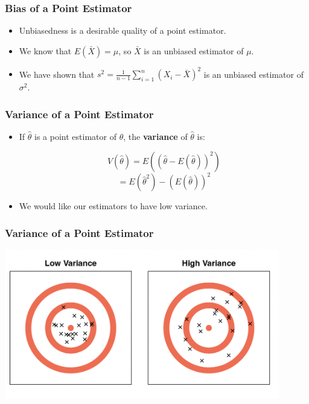 \documentclass[12pt]{beamer}
\begin{document}
\begin{frame}
	\frametitle{Bias of a Point Estimator}
	
	\begin{itemize}[label={\color{blue}$\blacktriangleright$}]
		\item Unbiasedness is a desirable quality of a point estimator.
		
		\item We know that $E(\bar{X}) = \mu$, so $\bar{X}$ is an unbiased estimator of $\mu$.
		
		\item We have shown that $s^2= \frac{1}{n-1} \sum_{i=1}^n (X_i - \bar{X})^2$ is an unbiased estimator of $\sigma^2$.
	\end{itemize}
	
\end{frame}

\begin{frame}
	\frametitle{Variance of a Point Estimator}
	
	\begin{itemize}[label={\color{blue}$\blacktriangleright$}]
		\item If $\hat{\theta}$ is a point estimator of $\theta$, the \textbf{variance} of $\hat{\theta}$ is:
		
		\[
		V(\hat{\theta}) = E\left(\left(\hat{\theta} - E(\hat{\theta})\right)^2\right)
		\]
		\[
		= E(\hat{\theta}^2) - \left(E(\hat{\theta})\right)^2
		\]
		
		\item We would like our estimators to have low variance.
	\end{itemize}
	
\end{frame}
\begin{frame}
	\frametitle{Variance of a Point Estimator}
	\includegraphics[width=12cm]{variance.png}
\end{frame}
\end{document}
